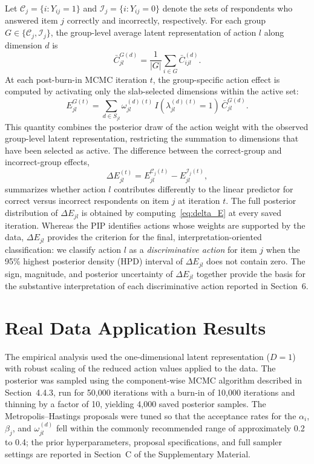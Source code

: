 \documentclass[A4paper,11pt]{article}
\begin{document}
Let $\mathcal{C}_{j}=\{i:Y_{ij}=1\}$ and $\mathcal{I}_{j}=\{i:Y_{ij}=0\}$ denote the sets of respondents who answered item $j$ correctly and incorrectly, respectively. For each group $G\in\{\mathcal{C}_{j},\mathcal{I}_{j}\}$, the group-level average latent representation of action $l$ along dimension $d$ is
\begin{equation}\label{eq:group_mean}
\bar{C}_{jl}^{G(d)}
=
\frac{1}{|G|}\sum_{i\in G}\bar{C}_{ijl}^{(d)}.
\end{equation}
At each post-burn-in MCMC iteration $t$, the group-specific action effect is computed by activating only the slab-selected dimensions within the active set:
\begin{equation}\label{eq:group_effect}
E_{jl}^{G(t)}
=
\sum_{d\in S_{jl}}
\omega_{jl}^{(d)(t)}\,
I\!\left(\lambda_{jl}^{(d)(t)}=1\right)\,
\bar{C}_{jl}^{G(d)}.
\end{equation}
This quantity combines the posterior draw of the action weight with the observed group-level latent representation, restricting the summation to dimensions that have been selected as active. The difference between the correct-group and incorrect-group effects,
\begin{equation}\label{eq:delta_E}
\Delta E_{jl}^{(t)}
=
E_{jl}^{\mathcal{C}_{j}(t)}
-
E_{jl}^{\mathcal{I}_{j}(t)},
\end{equation}
summarizes whether action $l$ contributes differently to the linear predictor for correct versus incorrect respondents on item $j$ at iteration $t$. The full posterior distribution of $\Delta E_{jl}$ is obtained by computing~\eqref{eq:delta_E} at every saved iteration. Whereas the PIP identifies actions whose weights are supported by the data, $\Delta E_{jl}$ provides the criterion for the final, interpretation-oriented classification: we classify action $l$ as a \emph{discriminative action} for item $j$ when the 95\% highest posterior density (HPD) interval of $\Delta E_{jl}$ does not contain zero. The sign, magnitude, and posterior uncertainty of $\Delta E_{jl}$ together provide the basis for the substantive interpretation of each discriminative action reported in Section~6.

\section{Real Data Application Results}

The empirical analysis used the one-dimensional latent representation ($D=1$) with robust scaling of the reduced action values applied to the data. The posterior was sampled using the component-wise MCMC algorithm described in Section~4.4.3, run for 50{,}000 iterations with a burn-in of 10{,}000 iterations and thinning by a factor of 10, yielding 4{,}000 saved posterior samples. The Metropolis--Hastings proposals were tuned so that the acceptance rates for the $\alpha_i$, $\beta_j$, and $\omega_{jl}^{(d)}$ fell within the commonly recommended range of approximately 0.2 to 0.4; the prior hyperparameters, proposal specifications, and full sampler settings are reported in Section~C of the Supplementary Material.
\end{document}
